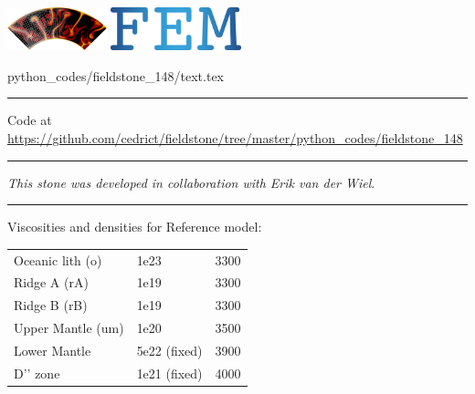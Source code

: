 \includegraphics[height=1.25cm]{images/pictograms/aspect_logo}
\includegraphics[height=1.25cm]{images/pictograms/FEM}


\begin{flushright} {\tiny {\color{gray} python\_codes/fieldstone\_148/text.tex}} \end{flushright}



\par\noindent\rule{\textwidth}{0.4pt}

\begin{center}
Code at \url{https://github.com/cedrict/fieldstone/tree/master/python_codes/fieldstone_148}
\end{center}

\par\noindent\rule{\textwidth}{0.4pt}

{\sl This stone was developed in collaboration with Erik van der Wiel}. 

\par\noindent\rule{\textwidth}{0.4pt}




Viscosities and densities for Reference model:

\begin{tabular}{lll}
\hline
Oceanic lith (o) &1e23 &3300\\
Ridge A   (rA) &1e19 &3300\\
Ridge B   (rB) &1e19 &3300\\
Upper Mantle (um) &1e20 &3500\\
Lower Mantle &5e22 (fixed) &3900\\
D’’ zone &1e21 (fixed) &4000\\
\hline
\end{tabular}



